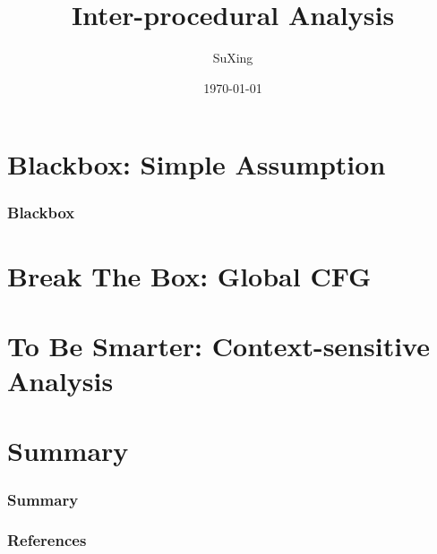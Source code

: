 \documentclass[]{beamer}
\title{Inter-procedural Analysis}
\author[SuXing~pysuxing@gmail.com]{SuXing}
\institute{TOW}
\date{\today}
\begin{document}
\setlength{\parindent}{0pt}

\frame{\titlepage}
\frame{\tableofcontents}

\section{Blackbox: Simple Assumption}
\frame{\tableofcontents[currentsection]}

\begin{frame}
  \frametitle{Blackbox}
  
\end{frame}

\section{Break The Box: Global CFG}
\frame{\tableofcontents[currentsection]}

\begin{frame}
  \frametitle{}
\end{frame}

\section{To Be Smarter: Context-sensitive Analysis}
\frame{\tableofcontents[currentsection]}

\begin{frame}
  \frametitle{}
\end{frame}

\section{Summary}
\frame{\tableofcontents[currentsection]}

\begin{frame}
  \frametitle{Summary}
\end{frame}

\begin{frame}
  \frametitle{References}
\end{frame}

\end{document}
